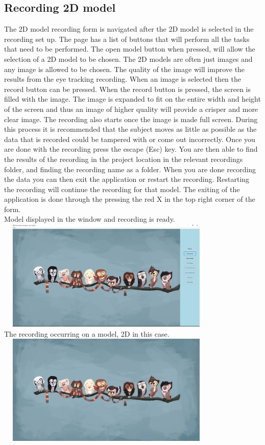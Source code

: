 \subsection{Recording 2D model}
The 2D model recording form is navigated after the 2D model is selected in the recording set up. The page has a list of buttons that will perform all the tasks that need to be performed. The open model button when pressed, will allow the selection of a 2D model to be chosen. The 2D models are often just images and any image is allowed to be chosen. The quality of the image will improve the results from the eye tracking recording. When an image is selected then the record button can be pressed. When the record button is pressed, the screen is filled with the image. The image is expanded to fit on the entire width and height of the screen and thus an image of higher quality will provide a crisper and more clear image. The recording also starts once the image is made full screen. During this process it is recommended that the subject moves as little as possible as the data that is recorded could be tampered with or come out incorrectly. Once you are done with the recording press the escape (Esc) key. You are then able to find the results of the recording in the project location in the relevant recordings folder, and finding the recording name as a folder. When you are done recording the data you can then exit the application or restart the recording. Restarting the recording will continue the recording for that model. The exiting of the application is done through the pressing the red X in the top right corner of the form.\\

Model displayed in the window and recording is ready.\\
\includegraphics[width=400px,height=200px]{./Images/ModelPreview.PNG}\\

The recording occurring on a model, 2D in this case.\\
\includegraphics[width=400px,height=200px]{./Images/ModelDisplay.PNG}\\

